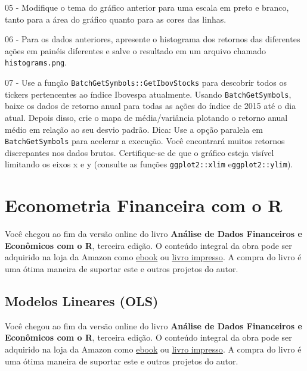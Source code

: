 \documentclass[
  11pt,
]{book}
\newenvironment{pleasebuyit}
{\begin{noteblock}
		
	} {\end{noteblock}}
\begin{document}
05 -
Modifique o tema do gráfico anterior para uma escala em preto e branco, tanto para a área do gráfico quanto para as cores das linhas.

06 -
Para os dados anteriores, apresente o histograma dos retornos das diferentes ações em painéis diferentes e salve o resultado em um arquivo chamado \texttt{\textquotesingle{}histograms.png\textquotesingle{}}.

07 -
Use a função \texttt{BatchGetSymbols::GetIbovStocks} para descobrir todos os tickers pertencentes ao índice Ibovespa atualmente. Usando \texttt{BatchGetSymbols}, baixe os dados de retorno anual para todas as ações do índice de 2015 até o dia atual. Depois disso, crie o mapa de média/variância plotando o retorno anual médio em relação ao seu desvio padrão. Dica: Use a opção paralela em \texttt{BatchGetSymbols} para acelerar a execução. Você encontrará muitos retornos discrepantes nos dados brutos. Certifique-se de que o gráfico esteja visível limitando os eixos x e y (consulte as funções \texttt{ggplot2::xlim} e\texttt{ggplot2::ylim}).

\hypertarget{modelos}{%
\chapter{Econometria Financeira com o R}\label{modelos}}

\begin{pleasebuyit}
Você chegou ao fim da versão online do livro \textbf{Análise de Dados
Financeiros e Econômicos com o R}, terceira edição. O conteúdo integral
da obra pode ser adquirido na loja da Amazon como
\href{https://www.amazon.com.br/dp/B08WNC27ZY}{ebook} ou
\href{https://www.amazon.com/dp/B08WP8CCDB}{livro impresso}. A compra do
livro é uma ótima maneira de suportar este e outros projetos do autor.
\end{pleasebuyit}

\hypertarget{modelos-lineares-ols}{%
\section{Modelos Lineares (OLS)}\label{modelos-lineares-ols}}

\begin{pleasebuyit}
Você chegou ao fim da versão online do livro \textbf{Análise de Dados
Financeiros e Econômicos com o R}, terceira edição. O conteúdo integral
da obra pode ser adquirido na loja da Amazon como
\href{https://www.amazon.com.br/dp/B08WNC27ZY}{ebook} ou
\href{https://www.amazon.com/dp/B08WP8CCDB}{livro impresso}. A compra do
livro é uma ótima maneira de suportar este e outros projetos do autor.
\end{pleasebuyit}
\end{document}
